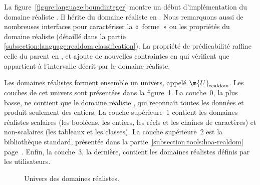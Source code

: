 La figure~\ref{figure:language:boundinteger} montre un début d'implémentation du
domaine réaliste . Il hérite du domaine réaliste
 en . Nous remarquons aussi de nombreuses interfaces
pour caractériser la «~forme~» ou les propriétés du domaine réaliste (détaillé
dans la partie \ref{subsection:language:realdom:classification}). La propriété
de prédicabilité raffine celle du parent en , et ajoute de nouvelles
contraintes en  qui vérifient que  appartient à
l'intervalle décrit par le domaine réaliste.

Les domaines réalistes forment ensemble un univers, appelé
$\m{U}_\mathrm{realdom}$. Les cou\-ches de cet univers sont présentées dans la
figure~\ref{figure:language:universe}. La couche~0, la plus basse, ne contient
que le domaine réaliste , qui reconnaît toutes les données et
produit seulement des entiers. La couche supérieure~1 contient les domaines
réalistes scalaires (les booléens, les entiers, les réels et les chaînes de
caractères) et non-scalaires (les tableaux et les classes). La couche
supérieure~2 est la bibliothèque standard, présentée dans la
partie~\ref{subsection:tools:hoa-realdom}
page~\pageref{subsection:tools:hoa-realdom}. Enfin, la couche~3, la dernière,
contient les domaines réalistes définis par les utilisateurs.

\begin{figure}


\caption{\label{figure:language:universe} Univers des domaines réalistes.}

\end{figure}

